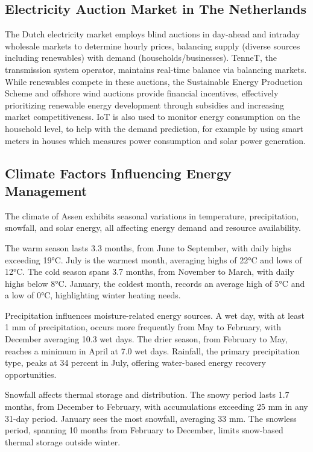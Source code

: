 \documentclass[conference]{IEEEtran}
\begin{document}
\subsection{Electricity Auction Market in The Netherlands}
The Dutch electricity market employs blind auctions in day-ahead and intraday wholesale markets to determine hourly prices, balancing supply (diverse sources including renewables) with demand (households/businesses). TenneT, the transmission system operator, maintains real-time balance via balancing markets\cite{tennetmarketfacilitation}. While renewables compete in these auctions, the Sustainable Energy
Production Scheme and offshore wind auctions provide financial incentives\cite{dutchoffshorewind}, effectively prioritizing renewable energy development through subsidies and increasing market competitiveness. IoT is also used to monitor energy consumption on the household level, to help with the demand prediction\cite{cbs2022slimmeapparaten}, for example by using smart meters in houses which measures power consumption and solar power generation. 

\subsection{Climate Factors Influencing Energy Management}
The climate of Assen exhibits seasonal variations in temperature, precipitation, snowfall, and solar energy, all affecting energy demand and resource availability.

The warm season lasts 3.3 months, from June to September, with daily highs exceeding 19°C. July is the warmest month, averaging highs of 22°C and lows of 12°C. The cold season spans 3.7 months, from November to March, with daily highs below 8°C. January, the coldest month, records an average high of 5°C and a low of 0°C, highlighting winter heating needs. \cite{weatherspark_assen}

Precipitation influences moisture-related energy sources. A wet day, with at least 1 mm of precipitation, occurs more frequently from May to February, with December averaging 10.3 wet days. The drier season, from February to May, reaches a minimum in April at 7.0 wet days. Rainfall, the primary precipitation type, peaks at 34 percent in July, offering water-based energy recovery opportunities. \cite{weatherspark_assen}

Snowfall affects thermal storage and distribution. The snowy period lasts 1.7 months, from December to February, with accumulations exceeding 25 mm in any 31-day period. January sees the most snowfall, averaging 33 mm. The snowless period, spanning 10 months from February to December, limits snow-based thermal storage outside winter. \cite{weatherspark_assen}
\end{document}

